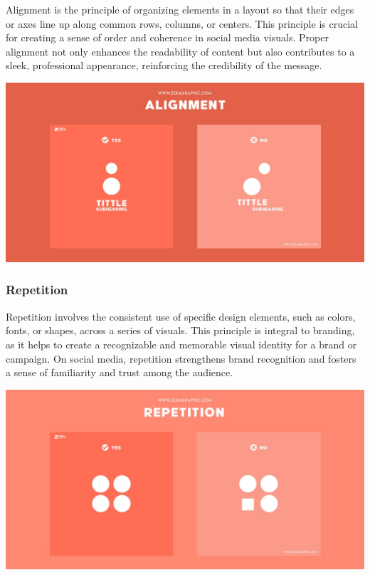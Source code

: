 \documentclass[
]{book}
\begin{document}
Alignment is the principle of organizing elements in a layout so that their edges or axes line up along common rows, columns, or centers. This principle is crucial for creating a sense of order and coherence in social media visuals. Proper alignment not only enhances the readability of content but also contributes to a sleek, professional appearance, reinforcing the credibility of the message.

\href{https://www.zekagraphic.com/visual-hierarchy-graphic-design-principles/}{\includegraphics[width=1\textwidth,height=\textheight]{images/clipboard-3373048530.png}}

\hypertarget{repetition}{%
\subsubsection*{Repetition}\label{repetition}}

Repetition involves the consistent use of specific design elements, such as colors, fonts, or shapes, across a series of visuals. This principle is integral to branding, as it helps to create a recognizable and memorable visual identity for a brand or campaign. On social media, repetition strengthens brand recognition and fosters a sense of familiarity and trust among the audience.

\href{https://www.zekagraphic.com/visual-hierarchy-graphic-design-principles/}{\includegraphics[width=1\textwidth,height=\textheight]{images/clipboard-2425648746.png}}
\end{document}
